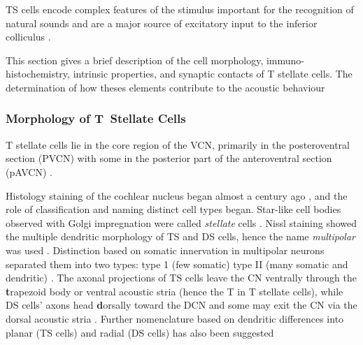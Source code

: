 
 TS cells encode complex features of the stimulus important for the recognition of
 natural sounds and are a major source of excitatory input to the inferior colliculus
 \citep{OertelWrightEtAl:2011}.

 This section gives a brief description of the cell morphology,
 immuno-histochemistry, intrinsic properties, and synaptic contacts of T stellate
 cells. The determination of how theses elements contribute to the acoustic behaviour

\subsubsection{Morphology of T~Stellate Cells}\label{sec:morph-t-stell}

 T stellate cells lie in the core region of the VCN, primarily in the posteroventral
 section (PVCN) with some in the posterior part of the anteroventral section (pAVCN)
 \citep{Osen:1969,Lorente:1981,BrawerMorestEtAl:1974,OertelWuEtAl:1990,DoucetRyugo:2006,DoucetRyugo:1997}.

 Histology staining of the cochlear nucleus began almost a century ago
 \citep{Lorente:1933}, and the role of classification and naming distinct cell types
 began. Star-like cell bodies observed with Golgi impregnation were called
 \textit{stellate} cells \citep{Osen:1969}. Nissl staining showed the multiple
 dendritic morphology of TS and DS cells, hence the name \textit{multipolar} was used
 \citep{BrawerMorestEtAl:1974,Lorente:1981}.  Distinction based on somatic
 innervation in multipolar neurons separated them into two types: type 1 (few
 somatic) type II (many somatic and dendritic) \citep{Cant:1981}.  The axonal
 projections of TS cells leave the CN ventrally through the \textbf{t}rapezoid body
 or ventral acoustic stria (hence the T in T stellate cells), while DS cells' axons
 head \textbf{d}orsally toward the DCN and some may exit the CN via the dorsal
 acoustic stria \citep{OertelWuEtAl:1990}.  Further nomenclature based on dendritic
 differences into planar (TS cells) and radial (DS cells) has also been suggested
 \citep{DoucetRyugo:1997,DoucetRyugo:2006}


